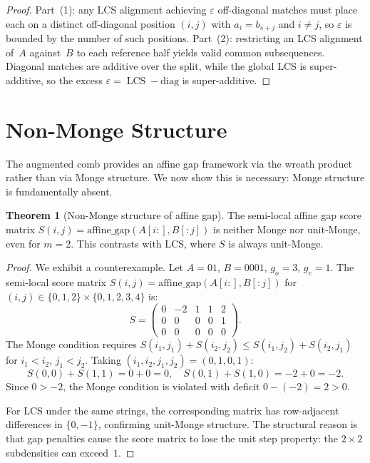 \documentclass[11pt, a4paper]{article}
\theoremstyle{definition}
\newtheorem{theorem}{Theorem}
\theoremstyle{remark}
\newcommand{\LCS}{\operatorname{LCS}}
\begin{document}
\begin{proof}
Part~(1): any LCS alignment achieving $\varepsilon$ off-diagonal
matches must place each on a distinct off-diagonal position $(i,j)$
with $a_i = b_{s+j}$ and $i \neq j$, so $\varepsilon$ is bounded
by the number of such positions.
Part~(2): restricting an LCS alignment of~$A$ against~$B$ to each
reference half yields valid common subsequences.
Diagonal matches
are additive over the split, while the global LCS is super-additive,
so the excess $\varepsilon = \LCS - \mathrm{diag}$ is super-additive.
\end{proof}

\section{Non-Monge Structure}\label{sec:non-monge}

The augmented comb provides an affine gap framework via the
wreath product rather than via Monge structure.
We now show
this is necessary: Monge structure is fundamentally absent.

\begin{theorem}[Non-Monge structure of affine gap]
\label{thm:non-monge}
The semi-local affine gap score matrix
$S(i,j) = \mathrm{affine\_gap}(A[i{:}], B[{:}j])$ is neither
Monge nor unit-Monge, even for $m{=}2$.
This contrasts with
LCS, where $S$ is always unit-Monge.
\end{theorem}

\begin{proof}
We exhibit a counterexample.
Let $A = 01$, $B = 0001$,
$g_o = 3$, $g_e = 1$.
The semi-local score matrix
$S(i,j) = \mathrm{affine\_gap}(A[i{:}], B[{:}j])$
for $(i,j) \in \{0,1,2\} \times \{0,1,2,3,4\}$ is:
\[
  S = \begin{pmatrix}
    0 & -2 & 1 & 1 & 2 \\
    0 & 0 & 0 & 0 & 1 \\
    0 & 0 & 0 & 0 & 0
  \end{pmatrix}.
\]
The Monge condition requires
$S(i_1, j_1) + S(i_2, j_2) \leq S(i_1, j_2) + S(i_2, j_1)$
for $i_1 < i_2$, $j_1 < j_2$.
Taking
$(i_1, i_2, j_1, j_2) = (0, 1, 0, 1)$:
\[
  S(0,0) + S(1,1) = 0 + 0 = 0,
  \quad
  S(0,1) + S(1,0) = -2 + 0 = -2.
\]
Since $0 > -2$, the Monge condition is violated with
deficit $0 - (-2) = 2 > 0$.

For LCS under the same strings, the corresponding matrix has
row-adjacent differences in $\{0, -1\}$, confirming unit-Monge
structure.
The structural reason is that gap penalties cause the
score matrix to lose the unit step property: the $2{\times}2$
subdensities can exceed~$1$.
\end{proof}
\end{document}
